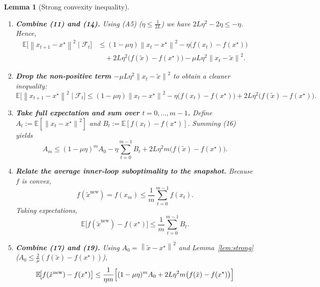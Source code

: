 \documentclass{article}
\newtheorem{lemma}{Lemma}
\newcommand{\E}{\mathbb{E}}
\newcommand{\norm}[1]{\left\lVert#1\right\rVert}
\newcommand{\inner}[2]{\left\langle #1,#2\right\rangle}
\begin{document}
\begin{lemma}[Strong convexity inequality]
\begin{enumerate}[label=[Step \arabic*], leftmargin=*]
\[
    \E\!\bigl[\norm{v_t-\nabla f(x_t)}^2\bigr]
    \le 2L\Bigl(f(x_t)-f(\tilde{x})-\inner{\nabla f(\tilde{x})}{x_t-\tilde{x}}\Bigr).
\tag{12}
\]
Since $\tilde{x}$ is fixed during the inner loop, we may apply (9) with $x=\tilde{x}$ to obtain
\[
    -\inner{\nabla f(\tilde{x})}{x_t-\tilde{x}}
    \le -\bigl(f(x_t)-f(\tilde{x})\bigr)-\frac{\mu}{2}\norm{x_t-\tilde{x}}^2.
\tag{13}
\]
Plugging (13) into (12) yields
\[
    \E\!\bigl[\norm{v_t-\nabla f(x_t)}^2\bigr]
    \le 2L\Bigl(f(\tilde{x})-f(x^\star)\Bigr)
       -\mu L\norm{x_t-\tilde{x}}^2.
\tag{14}
\]
\item \textbf{Combine (11) and (14).}  Using (A5) ($\eta\le\frac1{2L}$) we have $2L\eta^2-2\eta\le -\eta$. Hence,
\begin{align}
    \E\!\bigl[\norm{x_{t+1}-x^\star}^2\mid\mathcal{F}_t\bigr]
    &\le (1-\mu\eta)\norm{x_t-x^\star}^2
       -\eta\bigl(f(x_t)-f(x^\star)\bigr) \nonumber\\
    &\quad +2L\eta^2\bigl(f(\tilde{x})-f(x^\star)\bigr)
       -\mu L\eta^2\norm{x_t-\tilde{x}}^2.
\tag{15}
\end{align}
\item \textbf{Drop the non‑positive term $-\mu L\eta^2\norm{x_t-\tilde{x}}^2$} to obtain a cleaner inequality:
\[
    \E\!\bigl[\norm{x_{t+1}-x^\star}^2\mid\mathcal{F}_t\bigr]
    \le (1-\mu\eta)\norm{x_t-x^\star}^2
       -\eta\bigl(f(x_t)-f(x^\star)\bigr)
       +2L\eta^2\bigl(f(\tilde{x})-f(x^\star)\bigr).
\tag{16}
\]
\item \textbf{Take full expectation and sum over $t=0,\dots,m-1$.}  
Define $A_t:=\E[\norm{x_t-x^\star}^2]$ and $B_t:=\E[f(x_t)-f(x^\star)]$.  Summing (16) yields
\[
    A_m \le (1-\mu\eta)^m A_0
          -\eta\sum_{t=0}^{m-1} B_t
          +2L\eta^2 m\bigl(f(\tilde{x})-f(x^\star)\bigr).
\tag{17}
\]
\item \textbf{Relate the average inner‑loop suboptimality to the snapshot.}  
Because $f$ is convex,
\[
    f(\tilde{x}^{\text{new}})=f(x_m)
    \le \frac{1}{m}\sum_{t=0}^{m-1} f(x_t).
\tag{18}
\]
Taking expectations,
\[
    \E\!\bigl[f(\tilde{x}^{\text{new}})-f(x^\star)\bigr]
    \le \frac{1}{m}\sum_{t=0}^{m-1} B_t.
\tag{19}
\]
\item \textbf{Combine (17) and (19).}  Using $A_0=\norm{\tilde{x}-x^\star}^2$ and Lemma~\ref{lem:strong} ($A_0\le\frac{2}{\mu}(f(\tilde{x})-f(x^\star))$),
\begin{align}
    \E\!\bigl[f(\tilde{x}^{\text{new}})-f(x^\star)\bigr]
    &\le \frac{1}{\eta m}
           \Bigl[(1-\mu\eta)^m A_0
               +2L\eta^2 m\bigl(f(\tilde{x})-f(x^\star)\bigr)\Bigr] \nonumber\\

\end{align}
\end{enumerate}
\end{lemma}
\end{document}
